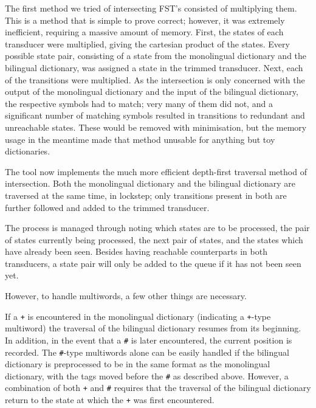 \documentclass[10pt, a4paper]{article}
\newcommand{\ana}[1]{\texttt{#1}}
\begin{document}
The first method we tried of intersecting FST's consisted of
multiplying them. This is a method that is simple to prove correct;
however, it was extremely inefficient, requiring a massive amount of
memory. First, the states of each transducer were multiplied, giving
the cartesian product of the states. Every possible state pair,
consisting of a state from the monolingual dictionary and the
bilingual dictionary, was assigned a state in the trimmed transducer.
Next, each of the transitions were multiplied. As the intersection is
only concerned with the output of the monolingual dictionary and the
input of the bilingual dictionary, the respective symbols had to
match; very many of them did not, and a significant number of matching
symbols resulted in transitions to redundant and unreachable states.
These would be removed with minimisation, but the memory usage in the
meantime made that method unusable for anything but toy dictionaries.

The tool now implements the much more efficient depth-first traversal
method of intersection. Both the monolingual dictionary and the
bilingual dictionary are traversed at the same time, in lockstep; only
transitions present in both are further followed and added to the
trimmed transducer.

The process is managed through noting which states are to be
processed, the pair of states currently being processed, the next pair
of states, and the states which have already been seen. Besides having
reachable counterparts in both transducers, a state pair will only be
added to the queue if it has not been seen yet.

However, to handle multiwords, a few other things are necessary.

If a \ana{+} is encountered in the monolingual dictionary (indicating
a \ana{+}-type multiword) the traversal of the bilingual dictionary
resumes from its beginning. In addition, in the event that a \ana{\#}
is later encountered, the current position is recorded. The
\ana{\#}-type multiwords alone can be easily handled if the bilingual
dictionary is preprocessed to be in the same format as the monolingual
dictionary, with the tags moved before the \ana{\#} as described
above. However, a combination of both \ana{+} and \ana{\#} requires
that the traversal of the bilingual dictionary return to the state at
which the \ana{+} was first encountered.

\end{document}
